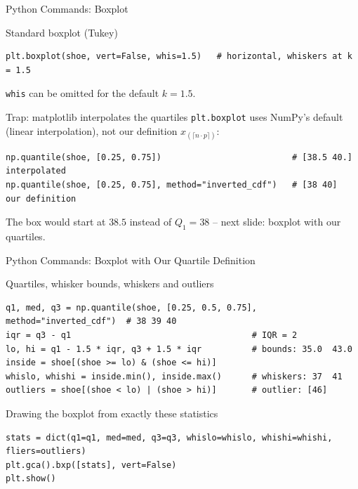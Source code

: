 \documentclass[aspectratio=169,11pt]{beamer}
\begin{document}
\begin{frame}[fragile]{Python Commands: Boxplot}
  \begin{block}{Standard boxplot (Tukey)}
    \begin{lstlisting}
plt.boxplot(shoe, vert=False, whis=1.5)   # horizontal, whiskers at k = 1.5
    \end{lstlisting}
    \texttt{whis} can be omitted for the default $k = 1.5$.
  \end{block}
  \begin{alertblock}{Trap: matplotlib interpolates the quartiles}
    \texttt{plt.boxplot} uses NumPy's default (linear interpolation), not our definition
    $x_{(\lceil n\cdot p\rceil)}$:
    \begin{lstlisting}
np.quantile(shoe, [0.25, 0.75])                          # [38.5 40.] interpolated
np.quantile(shoe, [0.25, 0.75], method="inverted_cdf")   # [38 40]    our definition
    \end{lstlisting}
    The box would start at $38.5$ instead of $Q_1 = 38$ -- next slide: boxplot with our quartiles.
  \end{alertblock}
\end{frame}

\begin{frame}[fragile]{Python Commands: Boxplot with Our Quartile Definition}
  \begin{block}{Quartiles, whisker bounds, whiskers and outliers}
    \begin{lstlisting}
q1, med, q3 = np.quantile(shoe, [0.25, 0.5, 0.75], method="inverted_cdf")  # 38 39 40
iqr = q3 - q1                                    # IQR = 2
lo, hi = q1 - 1.5 * iqr, q3 + 1.5 * iqr          # bounds: 35.0  43.0
inside = shoe[(shoe >= lo) & (shoe <= hi)]
whislo, whishi = inside.min(), inside.max()      # whiskers: 37  41
outliers = shoe[(shoe < lo) | (shoe > hi)]       # outlier: [46]
    \end{lstlisting}
  \end{block}
  \begin{block}{Drawing the boxplot from exactly these statistics}
    \begin{lstlisting}
stats = dict(q1=q1, med=med, q3=q3, whislo=whislo, whishi=whishi, fliers=outliers)
plt.gca().bxp([stats], vert=False)
plt.show()
    \end{lstlisting}
  \end{block}
\end{frame}
\end{document}
